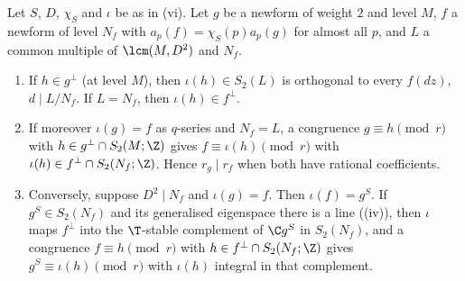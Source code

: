 \begin{proposition}\label{prop:hecke:twist-transport}
Let $S$, $D$, $\chi_S$ and $\iota$ be as in (vi). Let $g$ be a newform of weight $2$ and level $M$, $f$ a newform of level $N_f$ with $a_p(f)=\chi_S(p)a_p(g)$ for almost all $p$,
and $L$ a common multiple of $\lcm(M,D^2)$ and $N_f$.
\begin{enumerate}[label=(\roman*)]
\item If $h\in g^\perp$ (at level $M$), then $\iota(h)\in S_2(L)$ is orthogonal to every $f(dz)$, $d\mid L/N_f$. If $L=N_f$, then $\iota(h)\in f^\perp$.
\item If moreover $\iota(g)=f$ as $q$-series and $N_f=L$, a congruence $g\equiv h\pmod r$ with $h\in g^\perp\cap S_2(M;\Z)$ gives $f\equiv\iota(h)\pmod r$ with $\iota(h)\in f^\perp\cap S_2(N_f;\Z)$. Hence $r_g\mid r_f$
when both have rational coefficients.
\item Conversely, suppose $D^2\mid N_f$ and $\iota(g)=f$. Then $\iota(f)=g^S$. If $g^S\in S_2(N_f)$ and its generalised eigenspace there is a line ((iv)), then $\iota$
maps $f^\perp$ into the $\T$-stable complement of $\C g^S$ in $S_2(N_f)$, and a congruence $f\equiv h\pmod r$ with $h\in f^\perp\cap S_2(N_f;\Z)$ gives $g^S\equiv\iota(h)\pmod r$ with $\iota(h)$ integral in that
complement.
\end{enumerate}
\end{proposition}

